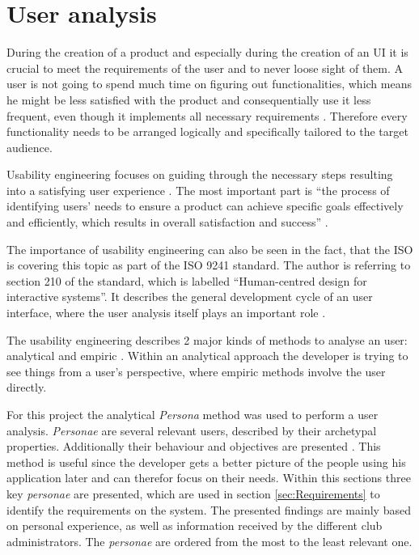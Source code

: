 \section{User analysis}
\label{sec:UserAnalysis}

During the creation of a product and especially during the creation of an \gls{UI} it is crucial to meet the requirements of the user and to never loose sight of them. A user is not going to spend much time on figuring out functionalities, which means he might be less satisfied with the product and consequentially use it less frequent, even though it implements all necessary requirements \cite{Frank:2013aa}. Therefore every functionality needs to be arranged logically and specifically tailored to the target audience.

Usability engineering focuses on guiding through the necessary steps resulting into a satisfying user experience \cite{Nielsen:1993aa}. The most important part is \enquote{the process of identifying users’ needs to ensure a product can achieve specific goals effectively and efficiently, which results in overall satisfaction and success} \cite{Frank:2013aa}.

The importance of usability engineering can also be seen in the fact, that the \gls{ISO} is covering this topic as part of the ISO 9241 standard. The author is referring to section 210 of the standard, which is labelled \enquote{Human-centred design for interactive systems}. It describes the general development cycle of an user interface, where the user analysis itself plays an important role \cite[p. 13]{Gulzow:2015aa}.

The usability engineering describes 2 major kinds of methods to analyse an user: analytical and empiric \cite[p. 20]{Gulzow:2015aa}. Within an analytical approach the developer is trying to see things from a user's perspective, where empiric methods involve the user directly. 

For this project the analytical \emph{Persona} method was used to perform a user analysis. \emph{Personae} are several relevant users, described by their archetypal properties. Additionally their behaviour and objectives are presented \cite[p. 30]{Gulzow:2015aa}. This method is useful since the developer gets a better picture of the people using his application later and can therefor focus on their needs. Within this sections three key \emph{personae} are presented, which are used in section \vref{sec:Requirements} to identify the requirements on the system. The presented findings are mainly based on personal experience, as well as information received by the different club administrators. The \emph{personae} are ordered from the most to the least relevant one.

